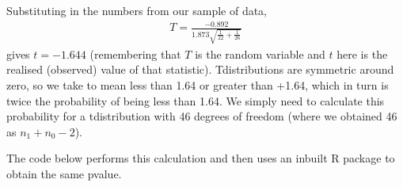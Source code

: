 \documentclass[letterpaper,10pt,english]{jupyterBook}
\begin{document}
\sphinxAtStartPar
Substituting in the numbers from our sample of data,
\begin{equation*}
\begin{split}
T = \frac{-0.892}{1.873 \sqrt{\frac{1}{22} + \frac{1}{26}}} 
\end{split}
\end{equation*}
\sphinxAtStartPar
gives \(t = -1.644\) (remembering that \(T\) is the random variable and \(t\) here is the realised (observed) value of that statistic). T\sphinxhyphen{}distributions are symmetric around zero, so we take  to mean less than \sphinxhyphen{}1.64 or greater than +1.64, which in turn is twice the probability of being less than \sphinxhyphen{}1.64. We simply need to calculate this probability for a t\sphinxhyphen{}distribution with 46 degrees of freedom (where we obtained 46 as \(n_1 + n_0 - 2\)).

\sphinxAtStartPar
The code below performs this calculation and then uses an inbuilt R package to obtain the same p\sphinxhyphen{}value.
\end{document}
